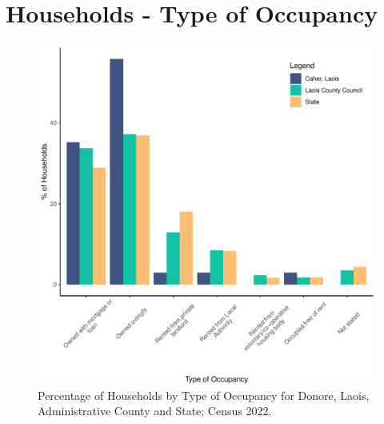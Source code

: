 \documentclass{article}
\begin{document}
\section{Households - Type of Occupancy}\label{sect:Households}
\begin{figure}[H]
	\centering
	\includegraphics[width = 140mm]{../figures/HouseholdsED.pdf}
	\caption{Percentage of Households by Type of Occupancy for Donore, Laois, Administrative County and State; Census 2022.}
	\label{fig:vbnv}
	\end{figure}
\end{document}
